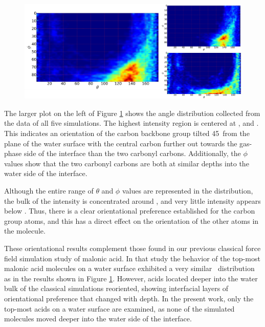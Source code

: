 \begin{figure}[h!]
	\begin{center}
		\includegraphics[scale=1.0]{images/orientation/theta-phi.png}
		\caption{}
		\label{fig:theta-phi}
	\end{center}
\end{figure}


The larger plot on the left of Figure \ref{fig:theta-phi} shows the angle distribution collected from the data of all five simulations. The highest intensity region is centered at \degr, and \degr. This indicates an orientation of the carbon backbone group tilted 45\degr~from the plane of the water surface with the central carbon further out towards the gas-phase side of the interface than the two carbonyl carbons. Additionally, the $\phi$ values show that the two carbonyl carbons are both at similar depths into the water side of the interface.

Although the entire range of $\theta$ and $\phi$ values are represented in the distribution, the bulk of the intensity is concentrated around \degr, and very little intensity appears below \degr. Thus, there is a clear orientational preference established for the carbon group atoms, and this has a direct effect on the orientation of the other atoms in the molecule.

These orientational results complement those found in our previous classical force field simulation study of malonic acid.\cite{Blower2012} In that study the behavior of the top-most malonic acid molecules on a water surface exhibited a very similar \thetaphi~distribution as in the results shown in Figure \ref{fig:theta-phi}. However, acids located deeper into the water bulk of the classical simulations reoriented, showing interfacial layers of orientational preference that changed with depth. In the present work, only the top-most acids on a water surface are examined, as none of the simulated molecules moved deeper into the water side of the interface.

